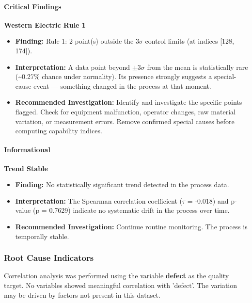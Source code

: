 \documentclass[12pt,a4paper]{article}
\begin{document}
\paragraph{\textcolor{sigmaRed}{Critical Findings}}
\textbf{Western Electric Rule 1}
\begin{itemize}[leftmargin=2em, itemsep=0pt]
  \item \textbf{Finding:} Rule 1: 2 point(s) outside the 3\(\sigma\) control limits (at indices [128, 174]).
  \item \textbf{Interpretation:} A data point beyond \(\pm\)3\(\sigma\) from the mean is statistically rare (\textasciitilde{}0.27\% chance under normality). Its presence strongly suggests a special-cause event --- something changed in the process at that moment.
  \item \textbf{Recommended Investigation:} Identify and investigate the specific points flagged. Check for equipment malfunction, operator changes, raw material variation, or measurement errors. Remove confirmed special causes before computing capability indices.
\end{itemize}
\medskip
\paragraph{\textcolor{sigmaGreen}{Informational}}
\textbf{Trend Stable}
\begin{itemize}[leftmargin=2em, itemsep=0pt]
  \item \textbf{Finding:} No statistically significant trend detected in the process data.
  \item \textbf{Interpretation:} The Spearman correlation coefficient (\(\tau\) = -0.018) and p-value (p = 0.7629) indicate no systematic drift in the process over time.
  \item \textbf{Recommended Investigation:} Continue routine monitoring. The process is temporally stable.
\end{itemize}
\medskip
\subsubsection*{Root Cause Indicators}
Correlation analysis was performed using the variable \textbf{defect} as the quality target.
\medskip
No variables showed meaningful correlation with 'defect'. The variation may be driven by factors not present in this dataset.
\end{document}
